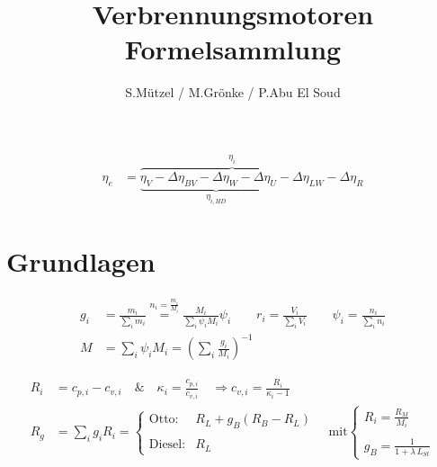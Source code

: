\documentclass[english,threecolumn,color]{latex4ei/latex4ei_sheet}
\title{Verbrennungsmotoren\\ Formelsammlung}
\author{S.Mützel / M.Grönke / P.Abu El Soud}	        %
\begin{document}
\ifdefined\GitRevision{}\fi

\maketitle	%
\begin{sectionbox}
	\begin{align*}
		\eta_{e}&= \overbrace{\underbrace{ \eta_{V}-\varDelta \eta_{BV} -\varDelta \eta_{W}-\varDelta \eta_{U}-}_{\eta_{i,HD}} \varDelta \eta_{LW}}^{\eta_i} -\varDelta \eta_{R}
	\end{align*}
\end{sectionbox}

\section{Grundlagen}
\begin{sectionbox}
	\begin{align*}
		g_i&=\frac{m_i}{\sum_{i} m_i} \overset{n_i=\frac{m_i}{M_i}}{=
		}\frac{M_i}{\sum_{i}\psi_i M_i}\psi_i \qquad
	    r_i=\frac{V_i}{\sum_{i} V_i} \qquad\psi_i=\frac{n_i}{\sum_{i} n_i}\\
		M&=\sum_{i}\psi_i M_i = \left( \sum_{i} \frac{g_i}{M_i} \right)^{-1}
	\end{align*}
\end{sectionbox}

\begin{sectionbox}
	\begin{align*}
		R_i&=c_{p,i} -c_{v,i} \quad  \&  \quad \kappa_i = \frac{c_{p,i}}{c_{v,i}} \quad \Rightarrow c_{v,i}=\frac{R_i}{\kappa_i-1}\\
		R_g&=\sum_{i} g_i R_i= \begin{cases}
		\text{Otto:} & R_L + g_B (R_B-R_L)\\\\
		\text{Diesel:} & R_L
		\end{cases} \quad \text{mit} \begin{cases}
			R_i=\frac{R_M}{M_i}\\\\
			g_B=\frac{1}{1+\lambda \, L_{St}}
		\end{cases}
	\end{align*}
\end{sectionbox}
\end{document}

